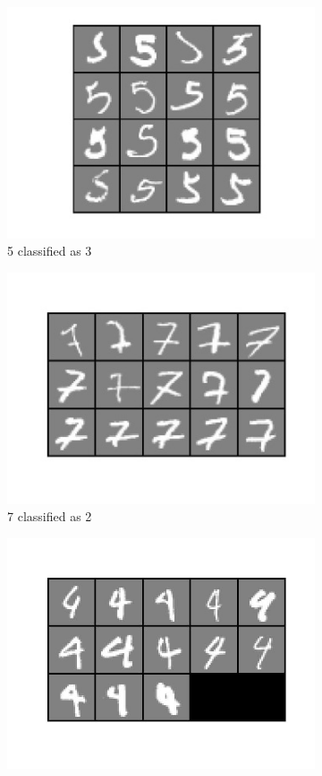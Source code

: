 \documentclass[conference]{IEEEtran}
\begin{document}
\begin{figure}[tmbh]
\begin{subfigure}{.23\textwidth}
  \centering
  \includegraphics[width=.8\linewidth]{53.jpg}
  \caption{5 classified as 3}
\end{subfigure}%
\begin{subfigure}{.23\textwidth}
  \centering
  \includegraphics[width=.8\linewidth]{72.jpg}
  \caption{7 classified as 2}
\end{subfigure}
\begin{subfigure}{.23\textwidth}
  \centering
  \includegraphics[width=.8\linewidth]{49.jpg}

\end{subfigure}
\end{figure}
\end{document}
